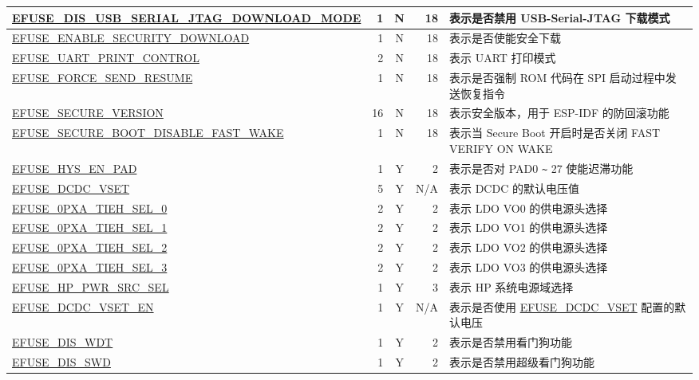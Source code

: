 \begin{longtable}[l]{ |m{8.2cm}|r|c|r|m{9.3cm}| }
    \hline
    \hyperref[fielddesc:EFUSEDISUSBSERIALJTAGDOWNLOADMODE]{EFUSE\_DIS\_USB\_SERIAL\_JTAG\_DOWNLOAD\_MODE} & 1 & N & 18 & 表示是否禁用 USB-Serial-JTAG 下载模式 \\
    \hline
    \hyperref[fielddesc:EFUSEENABLESECURITYDOWNLOAD]{EFUSE\_ENABLE\_SECURITY\_DOWNLOAD} & 1 & N & 18 & 表示是否使能安全下载  \\
    \hline
    \hyperref[fielddesc:EFUSEUARTPRINTCONTROL]{EFUSE\_UART\_PRINT\_CONTROL} & 2 & N & 18 & 表示 UART 打印模式\\
    \hline
    \hyperref[fielddesc:EFUSEFORCESENDRESUME]{EFUSE\_FORCE\_SEND\_RESUME} & 1 & N & 18 & 表示是否强制 ROM 代码在 SPI 启动过程中发送恢复指令 \\
    \hline
    \hyperref[fielddesc:EFUSESECUREVERSION]{EFUSE\_SECURE\_VERSION} & 16 & N & 18 & 表示安全版本，用于 ESP-IDF 的防回滚功能\\
    \hline
    \hyperref[fielddesc:EFUSESECUREBOOTDISABLEFASTWAKE]{EFUSE\_SECURE\_BOOT\_DISABLE\_FAST\_WAKE} & 1 & N & 18 & 表示当 Secure Boot 开启时是否关闭 FAST VERIFY ON WAKE\\
    \hline
    \hyperref[fielddesc:EFUSEHYSENPAD]{EFUSE\_HYS\_EN\_PAD} & 1 & Y & 2 & 表示是否对 PAD0 \verb+~+ 27 使能迟滞功能\\
    \hline
    \hyperref[fielddesc:EFUSEDCDCVSET]{EFUSE\_DCDC\_VSET} & 5 & Y & N/A & 表示 DCDC 的默认电压值\\
    \hline
    \hyperref[fielddesc:EFUSE0PXATIEHSEL0]{EFUSE\_0PXA\_TIEH\_SEL\_0} & 2 & Y & 2 & 表示 LDO VO0 的供电源头选择\\
    \hline
    \hyperref[fielddesc:EFUSE0PXATIEHSEL1]{EFUSE\_0PXA\_TIEH\_SEL\_1} & 2 & Y & 2 & 表示 LDO VO1 的供电源头选择\\
    \hline
    \hyperref[fielddesc:EFUSE0PXATIEHSEL2]{EFUSE\_0PXA\_TIEH\_SEL\_2} & 2 & Y & 2 & 表示 LDO VO2 的供电源头选择\\
    \hline
    \hyperref[fielddesc:EFUSE0PXATIEHSEL3]{EFUSE\_0PXA\_TIEH\_SEL\_3} & 2 & Y & 2 & 表示 LDO VO3 的供电源头选择\\
    \hline
    \hyperref[fielddesc:EFUSEHPPWRSRCSEL]{EFUSE\_HP\_PWR\_SRC\_SEL} & 1 & Y & 3 & 表示 HP 系统电源域选择\\
    \hline
    \hyperref[fielddesc:EFUSEDCDCVSETEN]{EFUSE\_DCDC\_VSET\_EN} & 1 & Y & N/A & 表示是否使用 \hyperref[fielddesc:EFUSEDCDCVSET]{EFUSE\_DCDC\_VSET} 配置的默认电压\\
    \hline
    \hyperref[fielddesc:EFUSEDISWDT]{EFUSE\_DIS\_WDT} & 1 & Y & 2 & 表示是否禁用看门狗功能\\
    \hline
    \hyperref[fielddesc:EFUSEDISSWD]{EFUSE\_DIS\_SWD} & 1 & Y & 2 & 表示是否禁用超级看门狗功能\\
    \hline
\end{longtable}

